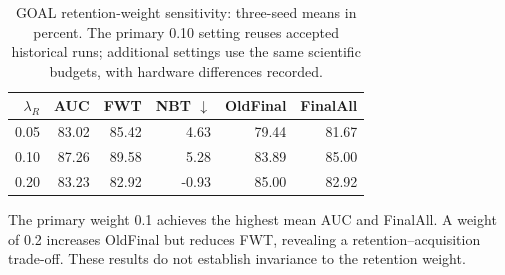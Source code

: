 \begin{table}[tb]
\centering\small
\caption{GOAL retention-weight sensitivity: three-seed means in percent. The primary 0.10 setting reuses accepted historical runs; additional settings use the same scientific budgets, with hardware differences recorded.}\label{tab:lambda}
\begin{tabular}{rrrrrr}
\toprule
$\lambda_R$ & AUC & FWT & NBT $\downarrow$ & OldFinal & FinalAll \\
\midrule
0.05 & 83.02 & 85.42 & 4.63 & 79.44 & 81.67 \\
0.10 & 87.26 & 89.58 & 5.28 & 83.89 & 85.00 \\
0.20 & 83.23 & 82.92 & -0.93 & 85.00 & 82.92 \\
\bottomrule
\end{tabular}
\end{table}

The primary weight 0.1 achieves the highest mean AUC and FinalAll. A weight of 0.2 increases OldFinal but reduces FWT, revealing a retention--acquisition trade-off. These results do not establish invariance to the retention weight.

